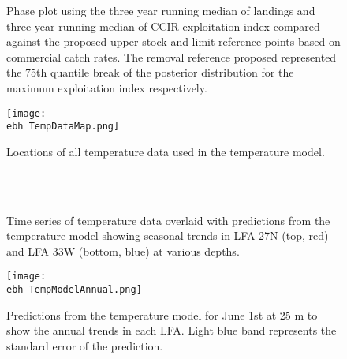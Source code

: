 \documentclass[11pt]{article}
\newcommand{\e}{/SpinDr/backup/bio_data/bio.lobster/figures/} %
\newcommand{\ebh}{/SpinDr/backup/bio_data/bio.lobster/figures/LFA2733Framework2018/} %
\begin{document}
\begin{figure}
        \centering
                    \caption{Phase plot using the three year running median of landings and three year running median of CCIR exploitation index compared against the proposed upper stock and limit reference points based on commercial catch rates. The removal reference proposed represented the 75th quantile break of the posterior distribution for the maximum exploitation index respectively.}
        \end{figure}



    \begin{figure}
    \centering
        \texttt{[image: \\ebh TempDataMap.png]}
        \caption{Locations of all temperature data used in the temperature model.}

    \end{figure}

        \begin{figure}
        \centering
                \\
                \\
        
         \caption{Time series of temperature data overlaid with predictions from the temperature model showing seasonal trends in LFA 27N (top, red) and LFA 33W (bottom, blue) at various depths.}
        \end{figure}



    \begin{figure}
    \centering
        \texttt{[image: \\ebh TempModelAnnual.png]}
        \caption{Predictions from the temperature model for June 1st at 25 m to show the annual trends in each LFA. Light blue band represents the standard error of the prediction.}

    \end{figure}
  
\end{document}
